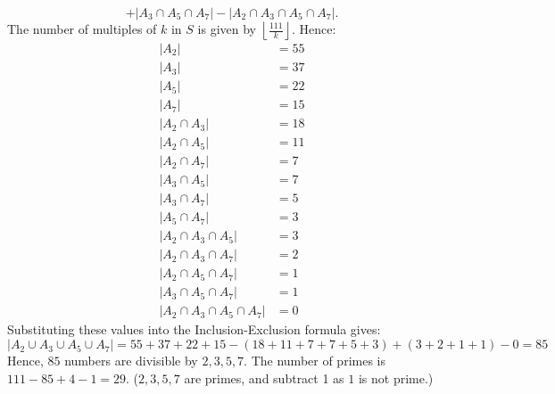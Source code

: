 \documentclass{article}
\begin{document}
\begin{enumerate}[label=(\alph*)]
          \[
              + |A_{3} \cap A_{5} \cap A_{7}| - |A_{2} \cap A_{3} \cap A_{5} \cap A_{7}|.
          \]
          The number of multiples of $k$ in $S$ is given by $\left\lfloor\frac{111}{k}\right\rfloor$. Hence:
          \begin{align*}
              |A_2|                            & = 55 \\
              |A_3|                            & = 37 \\
              |A_5|                            & = 22 \\
              |A_7|                            & = 15 \\
              |A_2 \cap A_3|                   & = 18 \\
              |A_2 \cap A_5|                   & = 11 \\
              |A_2 \cap A_7|                   & = 7  \\
              |A_3 \cap A_5|                   & = 7  \\
              |A_3 \cap A_7|                   & = 5  \\
              |A_5 \cap A_7|                   & = 3  \\
              |A_2 \cap A_3 \cap A_5|          & = 3  \\
              |A_2 \cap A_3 \cap A_7|          & = 2  \\
              |A_2 \cap A_5 \cap A_7|          & = 1  \\
              |A_3 \cap A_5 \cap A_7|          & = 1  \\
              |A_2 \cap A_3 \cap A_5 \cap A_7| & = 0
          \end{align*}
          Substituting these values into the Inclusion-Exclusion formula gives:
          \[
              |A_{2} \cup A_{3} \cup A_{5} \cup A_{7}| = 55 + 37 + 22 + 15 - (18 + 11 + 7 + 7 + 5 + 3) + (3 + 2 + 1 + 1) - 0 = 85
          \]
          Hence, $85$ numbers are divisible by $2,3,5,7$. The number of primes is $111-85+4-1=29$. ($2,3,5,7$ are primes, and subtract 1 as $1$ is not prime.)
\end{enumerate}


\newpage
\end{document}
